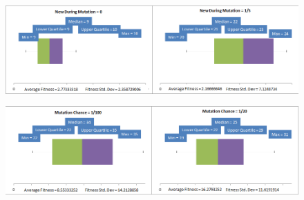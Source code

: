 \documentclass[]{report}
\begin{document}
\begin{figure}
	\centering
	\includegraphics[width=\textwidth]{figures/boxplots/newDuringMutation.png}
	\label{BPnewDuringMutation}
\end{figure}

\begin{figure}
	\centering
	\includegraphics[width=\textwidth]{figures/boxplots/mutationChance.png}
	\label{BPmutationChance}
\end{figure}
\end{document}
